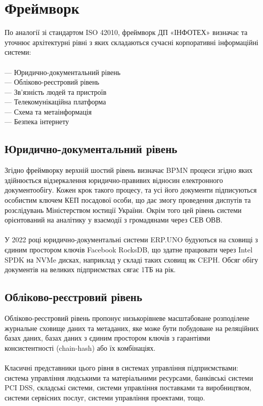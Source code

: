 \chapter{Фреймворк}

По аналогії зі стандартом ISO 42010, фреймворк ДП «ІНФОТЕХ» визначає та уточнює архітектурні рівні
з яких складаються сучасні корпоративні інформаційні системи:
\\
\\
--- Юридично-документальний рівень\\
--- Обліково-реєстровий рівень\\
--- Зв'язність людей та пристроїв\\
--- Телекомунікаційна платформа\\
--- Схема та метаінформація\\
--- Безпека інтернету\\

\section{Юридично-документальний рівень}

Згідно фреймворку верхній шостий рівень визначає BPMN процеси згідно яких здійнюється
відзеркалення юридично-правивих відносин електронного документообігу. Кожен крок такого
процесу, та усі його документи підписуються особистим ключем КЕП посадової особи, що дає
змогу проведення диспутів та розслідувань Міністерством юстиції України. Окрім того цей
рівень системи орієнтований на аналітику у взаємодії з громадянами через СЕВ ОВВ.
\\
\\
У 2022 році юридично-документальні системи ERP.UNO будуються на сховищі з єдиним
простором ключів Facebook RocksDB, що здатне працювати через Intel SPDK на NVMe
дисках, наприклад у складі таких сховищ як CEPH. Обсяг обігу документів на великих
підприємствах сягає 1ТБ на рік.

\newpage
\section{Обліково-реєстровий рівень}

Обліково-реєстровий рівень пропонує низькорівневе масштабоване розподілене
журнальне сховище даних та метаданих, яке може бути побудоване на реляційних
базах даних, базах даних з єдиним простором ключів з гарантіями
консистентності (chain-hash) або їх комбінаціях.
\\
\\
Класичні представники цього рівня в системах управління підприємствами: система
управління людськими та матеріальними ресурсами, банківські системи PCI DSS,
складські системи, системи управління поставками та виробництвом, системи сервісних
послуг, системи управління проектами, тощо.

